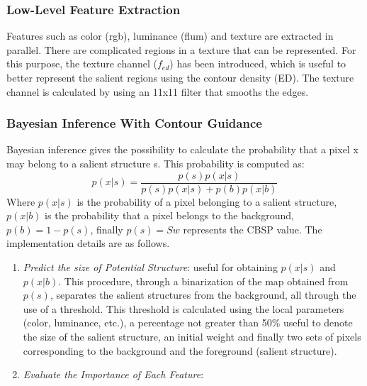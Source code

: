 \subsubsection{Low-Level Feature Extraction}
Features such as color (rgb), luminance (flum) and texture are extracted in 
parallel. There are complicated regions in a texture that can be represented. 
For this purpose, the texture channel ($ {f_{ed}} $)  has been introduced, which is 
useful to better represent the salient regions using the contour density (ED). 
The texture channel is calculated by using an 11x11 filter that smooths the 
edges.

\subsubsection{Bayesian Inference With Contour Guidance}
Bayesian inference gives the possibility to calculate the probability that a 
pixel x may belong to a salient structure s. This probability is computed as:
$$ p(x|s) = \frac{p(s)p(x|s)}{p(s)p(x|s)+p(b)p(x|b) } $$
Where $ p(x|s) $ is the probability of a pixel belonging to a salient structure, 
$ p(x|b) $ is the probability that a pixel belongs to the background, $ p(b)=1-p(s) $,
finally $ p(s)=Sw $ represents the CBSP value. The implementation 
details are as follows.
\begin{enumerate}
    \item \emph{Predict the size of Potential Structure}: useful for obtaining $ p(x|s) $ and 
    $ p(x|b) $. This procedure, through a binarization of the map obtained 
    from $ p(s) $, separates the salient structures from the background, all 
    through the use of a threshold. This threshold is calculated using the 
    local parameters (color, luminance, etc.), a percentage not greater than 
    50\% useful to denote the size of the salient structure, an initial weight 
    and finally two sets of pixels corresponding to the background and the 
    foreground (salient structure).
    \item \emph{Evaluate the Importance of Each Feature}:  
\end{enumerate}
